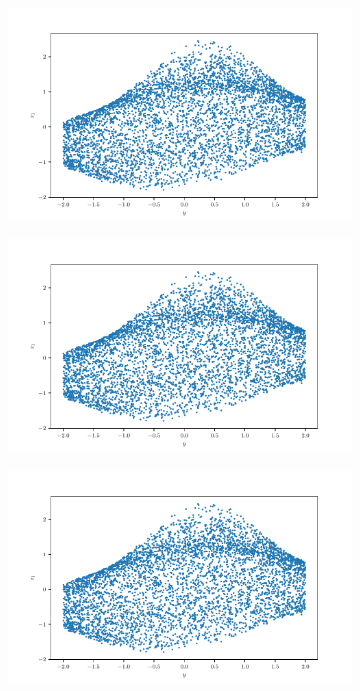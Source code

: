 \documentclass[10pt,a4paper]{article}
\begin{document}
\begin{figure}[!ht]
\begin{subfigure}{0.3\textwidth}
        \caption{}
        \label{fig_xz2}
    \end{subfigure}
    \begin{subfigure}{0.3\textwidth}
        \centering	
        \includegraphics[width=\textwidth]{square_y_z1.pdf}
        \caption{}
        \label{fig_yz0}
    \end{subfigure}
    \begin{subfigure}{0.3\textwidth}
        \centering
        \includegraphics[width=\textwidth] {square_y_z1.pdf}
        \caption{}
        \label{fig_yz1}
    \end{subfigure}
    \begin{subfigure}{0.3\textwidth}
        \centering	
        \includegraphics[width=\textwidth]{square_y_z1.pdf}

\end{subfigure}
\end{figure}
\end{document}
